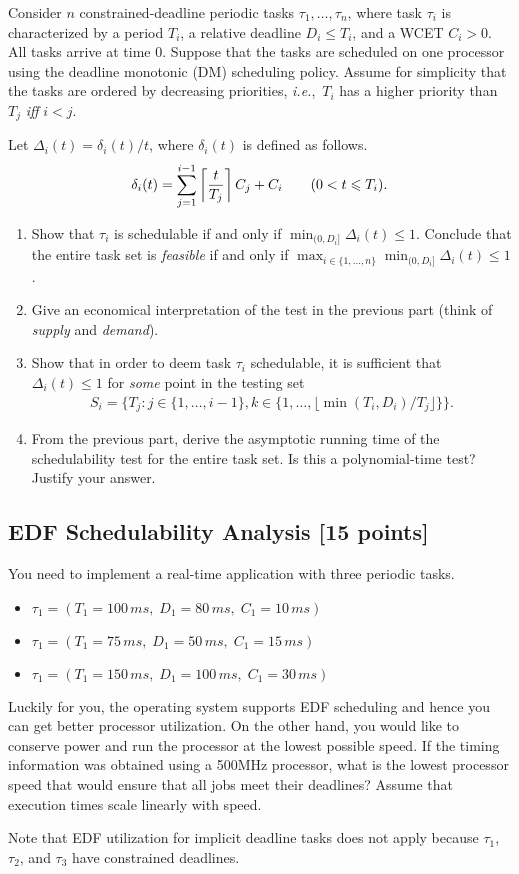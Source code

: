 \documentclass[12pt]{article}
\newcommand{\ie}{{\textit{i.e.}}}
\begin{document}
Consider $n$ constrained-deadline periodic tasks $\tau_1, \dotsc, \tau_n$,
where task $\tau_i$ is characterized by a period $T_i$, a relative deadline
$D_i \leq T_i$, and a WCET $C_i > 0$. All tasks arrive at time $0$. Suppose
that the tasks are scheduled on one processor using the deadline monotonic (DM)
scheduling policy. Assume for simplicity that the tasks are ordered by
decreasing priorities, \ie,~$T_{i}$ has a higher priority than $T_{j}$
\textit{iff} $i<j$.

Let $\Delta_{i}(t) = \delta_{i}(t)/t$, where $\delta_{i}(t)$ is defined as
follows.
\begin{align*}
  \delta_{i}(t) = \sum_{j=1}^{i-1}\left \lceil { t \over T_{j}}\right\rceil
  C_{j} + C_{i} \qquad (0 <t \leqslant T_{i}).
\end{align*}
\begin{enumerate}

\item Show that $\tau_i$ is schedulable if and only if
$\min_{(0,D_{i}]}\Delta_{i}(t) \leq 1$. Conclude that the entire task set is
\textit{feasible} if and only if $\max_{i \in
\{1,\dotsc,n\}}\min_{(0,D_{i}]}\Delta_{i}(t) \leq 1$.

\item Give an economical interpretation of the test in the previous part
(think of \textit{supply} and \textit{demand}).

\item Show that in order to deem task $\tau_i$ schedulable, it is sufficient
that $\Delta_{i}(t) \leq 1$ for \emph{some} point in the testing set 
\begin{align*}
S_{i} = \Bigr \{T_j: j \in \{1,\dotsc, i-1\}, k \in \bigl \{1, \dotsc, \lfloor  \min(T_i, D_i)/T_j \rfloor \bigr \} \Bigr\}.
\end{align*}

\item From the previous part, derive the asymptotic running time of the
schedulability test for the entire task set. Is this a polynomial-time test?
Justify your answer.
\end{enumerate}

\subsection{EDF Schedulability Analysis [15 points]}
You need to implement a real-time application with three periodic tasks.
\begin{itemize}
\item $\tau_{1} = (T_1 = 100\,ms, \; D_1 =  80\,ms, \; C_1=10\,ms)$
\item $\tau_{1} = (T_1 = 75\,ms,  \; D_1 =  50\,ms, \; C_1=15\,ms)$
\item $\tau_{1} = (T_1 = 150\,ms, \; D_1 = 100\,ms, \; C_1=30\,ms)$
\end{itemize}
Luckily for you, the operating system supports EDF scheduling and hence you can
get better processor utilization. On the other hand, you would like to conserve
power and run the processor at the lowest possible speed. If the timing
information was obtained using a 500MHz processor, what is the lowest processor
speed that would ensure that all jobs meet their deadlines? Assume that
execution times scale linearly with speed.

Note that EDF utilization for
implicit deadline tasks does not apply because $\tau_1$, $\tau_2$, and $\tau_3$
have constrained deadlines. 
\end{document}
